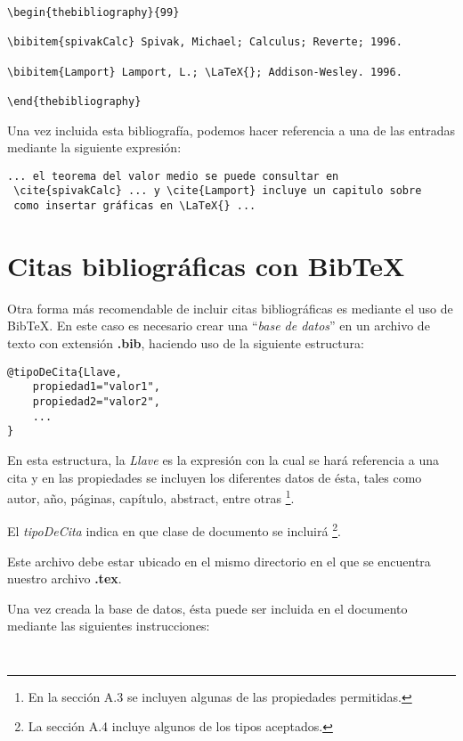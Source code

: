 \documentclass[letterpaper,12pt]{book}
\begin{document}
\begin{verbatim}
\begin{thebibliography}{99}

\bibitem{spivakCalc} Spivak, Michael; Calculus; Reverte; 1996.

\bibitem{Lamport} Lamport, L.; \LaTeX{}; Addison-Wesley. 1996.

\end{thebibliography}
\end{verbatim}

Una vez incluida esta bibliografía, podemos hacer referencia a
una de las entradas mediante la siguiente expresión:

\begin{verbatim}
... el teorema del valor medio se puede consultar en
 \cite{spivakCalc} ... y \cite{Lamport} incluye un capitulo sobre
 como insertar gráficas en \LaTeX{} ...
\end{verbatim}

\section{Citas bibliográficas con Bib\TeX{}}

Otra forma más recomendable de incluir citas bibliográficas es
mediante el uso de Bib\TeX{}. En este caso es necesario crear
una ``\textit{base de datos}'' en un archivo de texto con 
extensión \textbf{.bib}, haciendo uso de la siguiente estructura:

\begin{verbatim}
@tipoDeCita{Llave,
	propiedad1="valor1",
	propiedad2="valor2",
	...
}
\end{verbatim}

En esta estructura, la \emph{Llave} es la expresión con la cual 
se hará referencia a una cita y en las propiedades se incluyen
los diferentes datos de ésta, tales como autor, año, páginas,
capítulo, abstract, entre otras \footnote{En la sección A.3
se incluyen algunas de las propiedades permitidas.}.

El \emph{tipoDeCita} indica en que clase de documento se incluirá
\footnote{La sección A.4 incluye algunos de los tipos
aceptados.}.

Este archivo debe estar ubicado en el mismo directorio en el que
se encuentra nuestro archivo \textbf{.tex}.

Una vez creada la base de datos, ésta puede ser incluida en el
documento mediante las siguientes instrucciones:

\begin{verbatim}


\end{verbatim}
\end{document}
